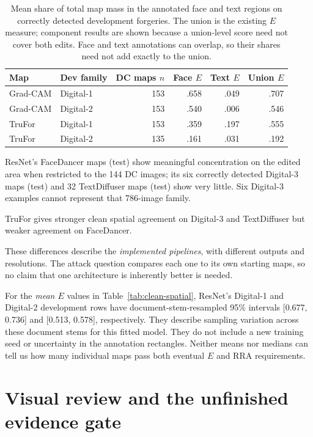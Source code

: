 \begin{table}[htbp]
\centering\small
\caption{Mean share of total map mass in the annotated face and text regions on correctly detected development forgeries. The union is the existing $E$ measure; component results are shown because a union-level score need not cover both edits. Face and text annotations can overlap, so their shares need not add exactly to the union.}
\label{tab:clean-components}
\begin{tabular}{@{}llr|rrr@{}}
\toprule
Map & Dev family & DC maps $n$ & Face $E$ & Text $E$ & Union $E$ \\
\midrule
Grad-CAM & Digital-1 & 153 & .658 & .049 & .707 \\
Grad-CAM & Digital-2 & 153 & .540 & .006 & .546 \\
\midrule
TruFor & Digital-1 & 153 & .359 & .197 & .555 \\
TruFor & Digital-2 & 135 & .161 & .031 & .192 \\
\bottomrule
\end{tabular}
\end{table}

ResNet's FaceDancer maps (test) show meaningful concentration on the edited area when restricted to the 144 DC images; its six correctly detected Digital-3 maps (test) and 32 TextDiffuser maps (test) show very little. Six Digital-3 examples cannot represent that 786-image family. 

TruFor gives stronger clean spatial agreement on Digital-3 and TextDiffuser but weaker agreement on FaceDancer. 

These differences describe the \emph{implemented pipelines}, with different outputs and resolutions. The attack question compares each one to its own starting maps, so no claim that one architecture is inherently better is needed.

For the \emph{mean $E$} values in Table~\ref{tab:clean-spatial}, ResNet's Digital-1 and Digital-2 development rows have document-stem-resampled 95\% intervals [0.677, 0.736] and [0.513, 0.578], respectively. They describe sampling variation across these document stems for this fitted model. They do not include a new training seed or uncertainty in the annotation rectangles. Neither means nor medians can tell us how many individual maps pass both eventual $E$ and RRA requirements.

\section{Visual review and the unfinished evidence gate}
\label{sec:clean-review}

